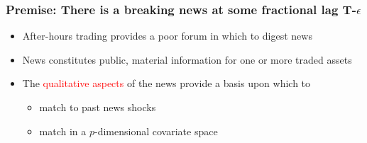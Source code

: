 \documentclass[9pt]{beamer}
\newcommand{\simiid}{\stackrel{iid}{\sim}} %
\theoremstyle{definition}
\begin{document}
\begin{frame}
    \frametitle{Premise: There is a breaking news at some fractional lag T-$\epsilon$}
    
    \begin{itemize}
    \item After-hours trading provides a poor forum in which to digest news
    \item News constitutes public, material information for one or more traded assets
    \item The \textcolor{red}{qualitative aspects} of the news provide a basis upon which to 
    \begin{itemize}
        \item match to past news shocks
        \item match in a $p$-dimensional covariate space
    \end{itemize}
    \end{itemize}
    \end{frame}


    
       
    
        
        
    
    
    
\end{document}
